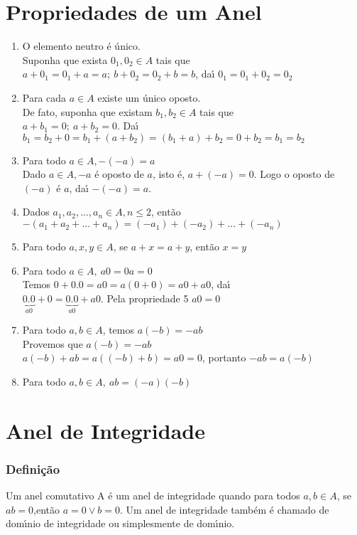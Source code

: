 \section{Propriedades de um Anel}
\begin{enumerate}
\item O elemento neutro {\'e} {\'u}nico.\\
Suponha que exista $0_{1},0_{2}\in A$ tais que\\
$a+0_{1}=0_{1}+a=a;\ b+0_{2}=0_{2}+b=b$, da{\'\i} $0_{1}=0_{1}+0_{2}=0_{2}$
\item Para cada $a\in A$ existe um {\'u}nico oposto.\\
De fato, suponha que existam $b_{1},b_{2}\in A$ tais que\\
$a+b_{1}=0;\ a+b_{2}=0$. Da{\'\i} $b_{1}=b_{2}+0=b_{1}+(a+b_{2})=(b_{1}+a)+b_{2}=0+b_{2}=b_{1}=b_{2}$
\item Para todo $a\in A, -(-a)=a$\\
Dado $a\in A,-a$ {\'e} oposto de $a$, isto {\'e}, $a+(-a)=0$. Logo o oposto de $(-a)$ {\'e} $a$, da{\'\i} $-(-a)=a$.
\item Dados $a_{1},a_{2},...,a_{n}\in A, n\leq 2$, ent{\~a}o\\
$-(a_{1}+a_{2}+...+a_{n})=(-a_{1})+(-a_{2})+...+(-a_{n})$
\item Para todo $a,x,y\in A$, se $a+x=a+y$, ent{\~a}o $x=y$
\item Para todo $a\in A,\ a0=0a=0$\\
Temos $0+0.0=a0=a(0+0)=a0+a0$, da{\'\i}\\
$\underbrace{0.0}_{a0}+0=\underbrace{0.0}_{a0}+a0$. Pela propriedade 5 $a0=0$
\item Para todo $a,b\in A$, temos $a(-b)=-ab$\\
Provemos que $a(-b)=-ab$\\
$a(-b)+ab=a((-b)+b)=a0=0$, portanto $-ab=a(-b)$
\item Para todo $a,b\in A,\ ab=(-a)(-b)$\\
\end{enumerate}

\section{Anel de Integridade}
\subsubsection{Defini{\c c}{\~a}o}

\begin{definicao} Um anel comutativo A {\'e} um anel de integridade quando para todos $a,b\in A$, se $ab=0$,ent{\~a}o $a=0\vee b=0$. Um anel de integridade tamb{\'e}m {\'e} chamado de dom{\'\i}nio de integridade ou simplesmente de dom{\'\i}nio.\end{definicao}

